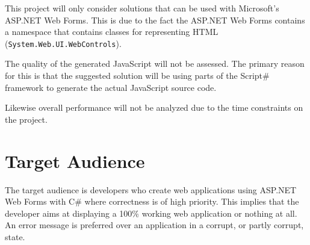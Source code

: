 		This project will only consider solutions that can be used with Microsoft's ASP.NET Web Forms. This is due to the fact the ASP.NET Web Forms contains a namespace that contains classes for representing HTML (\texttt{System.Web.UI.WebControls}).

		The quality of the generated JavaScript will not be assessed. The primary reason for this is that the suggested solution will be using parts of the Script\# framework to generate the actual JavaScript source code.

		Likewise overall performance will not be analyzed due to the time constraints on the project.


\section{Target Audience} %
\label{sec:section_name}
	The target audience is developers who create web applications using ASP.NET Web Forms with C\# where correctness is of high priority. This implies that the developer aims at displaying a 100\% working web application or nothing at all. An error message is preferred over an application in a corrupt, or partly corrupt, state.






